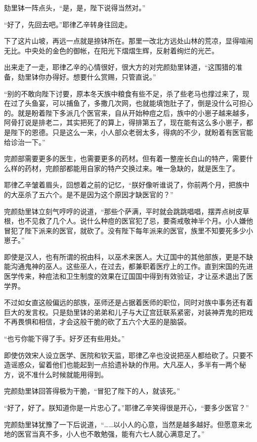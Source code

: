 劾里钵一阵点头，“是，是，陛下说得当然对。”

“好了，先回去吧。”耶律乙辛转身往回走。

下了这片山坡，再远一点就是捺钵所在。那里一改北方远处山林的荒凉，显得喧闹无比。中央处的金色的御帐，在阳光下熠熠生辉，反射着绚烂的光芒。

出来走了一走，耶律乙辛的心情很好，很大方的对完颜劾里钵道，“这围猎的准备，劾里钵你办得好。想要什么赏赐，只管直说。”

“别的不敢向陛下讨要，原本冬天族中粮食有些不足，杀了些老马也撑过来了，现在过了头鱼宴，可以捕鱼了，多撒几次网，也就能填饱肚子了，倒是没什么可担心的。就是盼着陛下多派几个医官来，自从开始种痘之后，族中的小崽子越来越多，阿骨打说是排老二，其实把死了的算上，得排第五了，现在能有这么多小崽子，都是陛下的恩德。只是这么一来，小人部众老弱太多，得病的不少，就盼着有医官能给诊治一下。”

完颜部需要更多的医生，也需要更多的药材。但有着一整座长白山的特产，需要什么样的药材，完颜部都能用自家的特产交换过来。唯一急缺的，就是医生了。

耶律乙辛皱着眉头，回想着之前的记忆，“朕好像听谁说了，你前两个月，把族中的大巫杀了五六个。是不是因为这个原因才缺医官的？”

完颜劾里钵立刻气哼哼的说道，“那些个萨满，平时就会跳跳唱唱，摆弄点树皮草根，也不见救了几个人。说什么种痘的医官犯了忌，要斋戒敬神半个月。小人嫌他冒犯了陛下派来的医官，就砍了。没有陛下每年派来的医官，族里不知要死多少小崽子。”

即使是汉人，也有所谓的祝由科，以巫术来医人。大辽国中的其他部族，更是不缺能沟通鬼神的巫人。这些巫人，在过去，都兼职着医疗上的工作。直到宋国的先进医学传来，种痘法和卫生制度的效果在辽国国中得到有效验证，才让巫术退出了医学界。

不过如女直这般偏远的部族，巫师还是占据着医师的职位，同时对族中事务还有着巨大的发言权。只是劾里钵的弟弟和儿子与大辽宫廷联系紧密，对装神弄鬼的把戏不再畏惧和相信，才会这般干脆的砍了五六个大巫的是脑袋。

“也亏你能下得了手。好歹还有些用处。”

即使仿效宋人设立医学、医院和钦天监，耶律乙辛也没说把巫人都给砍了。只要不造谣惑众，留着他们也能起到一点拾遗补缺的作用。大凡巫人，多半有一两个秘方，说不准什么时候就能用得到。

完颜劾里钵回答得极为干脆，“冒犯了陛下的人，就该死。”

“好了，好了。朕知道你是一片忠心了。”耶律乙辛笑得很是开心，“要多少医官？”

完颜劾里钵犹豫了一下后说道，“……以小人的心意，当然是越多越好。但愿意来北地的医官当真不多，小人也不敢勉强，能有六七人就心满意足了。”

